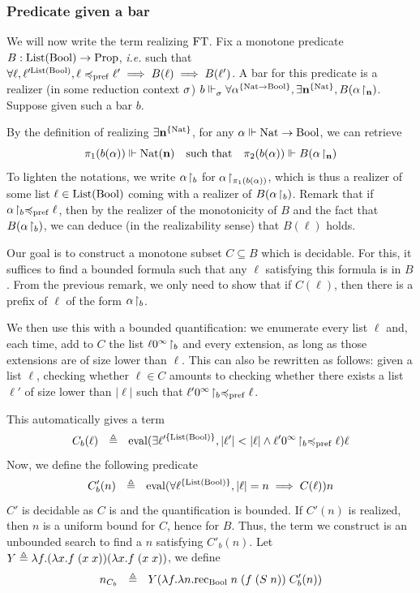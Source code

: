 \documentclass[a4paper,UKenglish,cleveref, autoref, thm-restate]{lipics-v2021}
\begin{document}
\subsubsection{Predicate given a bar}

We will now write the term realizing $\mathrm{FT}$.
Fix a monotone predicate $B : \mathrm{List}(\mathrm{Bool}) \to \mathrm{Prop}$, \textit{i.e.} such that
$\forall \ell, \ell'^{\mathrm{List}(\mathrm{Bool})}, \ell \preccurlyeq_{\mathrm{pref}} \ell' \implies B(\ell) \implies B(\ell')$.
A bar for this predicate is a realizer (in some reduction context $\sigma$)
$b \Vdash_{\sigma}^{} \forall \alpha^{\{\mathrm{Nat} \to \mathrm{Bool}\}}, \exists \mathbf{n}^{\{\mathrm{Nat}\}}, B({\alpha}\!\upharpoonright_{\mathbf{n}})$.
Suppose given such a bar $b$.

By the definition of realizing $\exists \mathbf{n}^{\{\mathrm{Nat}\}}$, for any $\alpha \Vdash \mathrm{Nat} \to \mathrm{Bool}$, we can retrieve
\[\pi_1(b(\alpha))\Vdash \mathrm{Nat}(\mathbf{n})\quad\text{such that}\quad \pi_2(b(\alpha))\Vdash B({\alpha}\!\upharpoonright_{\mathbf{n}})\]
To lighten the notations, we write ${\alpha}\!\upharpoonright_{b}$ for ${\alpha}\!\upharpoonright_{\pi_1(b(\alpha))}$, which is thus a realizer of some list $\ell \in \mathrm{List}(\mathrm{Bool})$ coming with a realizer of $B({\alpha}\!\upharpoonright_{b})$.
Remark that if ${\alpha}\!\upharpoonright_{b}\preccurlyeq_{\mathrm{pref}}\ell$, then by the realizer of the monotonicity of $B$ and the fact that $B({\alpha}\!\upharpoonright_{b})$, we can deduce (in the realizability sense) that $B(\ell)$ holds.

Our goal is to construct a monotone subset $C\subseteq B$ which is decidable. For this, it suffices to find a bounded formula such that any $\ell$ satisfying this formula is in $B$. From the previous remark, we only need to show that if $C(\ell)$, then there is a prefix of $\ell$ of the form ${\alpha}\!\upharpoonright_{b}$.

We then use this with a bounded quantification: we enumerate every list $\ell$ and, each time, add to $C$ the list ${\ell0^\infty}\!\upharpoonright_{b}$ and every extension, as long as those extensions are of size lower than $\ell$. This can also be rewritten as follows: given a list $\ell$, checking whether $\ell \in C$ amounts to checking whether there exists a list $\ell'$ of size lower than $|\ell|$ such that ${\ell'0^\infty}\!\upharpoonright_{b}\preccurlyeq_{\mathrm{pref}} \ell$.

This automatically gives a term
\[C_b(\ell) ~~\triangleq~~ \mathrm{eval} (\exists \ell'^{\{\mathrm{List}(\mathrm{Bool})\}}, |\ell'| < |\ell| \land {\ell'0^\infty}\!\upharpoonright_{b} \preccurlyeq_{\mathrm{pref}} \ell)\ell\]
Now, we define the following predicate
\[C'_b(n) ~~\triangleq~~ \mathrm{eval} (\forall \ell^{\{\mathrm{List}(\mathrm{Bool})\}}, |\ell| = n \implies C(\ell))n\]
$C'$ is decidable as $C$ is and the quantification is bounded. If $C'(n)$ is realized, then $n$ is a uniform bound for $C$, hence for $B$. Thus, the term we construct is an unbounded search to find a $n$ satisfying $C'_b(n)$. Let $Y \triangleq \lambda f.(\lambda x.f\;(x\;x))(\lambda x.f\;(x\;x))$, we define
\[n_{C_b} ~~\triangleq~~ Y(\lambda f.\lambda n.\mathrm{rec}_{\mathrm{Bool}}\;n\;(f\;(S\;n))\;C'_b(n))\]
\end{document}
